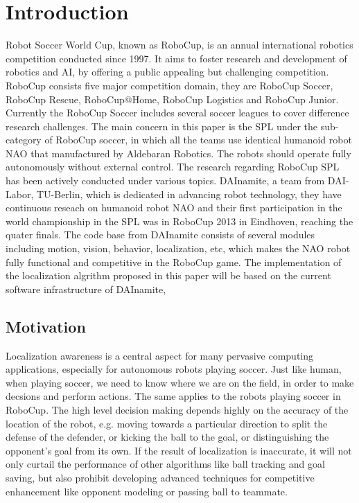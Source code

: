 \chapter{Introduction\label{cha:chapter1}}

Robot Soccer World Cup, known as RoboCup, is an annual international robotics competition conducted since 1997. It aims to foster research and development of robotics and \gls{AI}, by offering a public appealing but challenging competition. RoboCup consists five major competition domain, they are RoboCup Soccer, RoboCup Rescue, RoboCup@Home, RoboCup Logistics and RoboCup Junior. Currently the RoboCup Soccer includes several soccer leagues to cover difference research challenges. The main concern in this paper is the \gls{SPL} under the sub-category of RoboCup soccer, in which all the teams use identical humanoid robot NAO that manufactured by Aldebaran Robotics{\textregistered}. The robots should operate fully autonomously without external control. 
The research regarding RoboCup \gls{SPL} has been actively conducted under various topics. DAInamite, a team from DAI-Labor, TU-Berlin, which is dedicated in advancing robot technology, they have continuous reseach on humanoid robot NAO and their first participation in the world championship in the SPL was in RoboCup 2013 in Eindhoven, reaching the quater finals. The code base from DAInamite consists of several modules including motion, vision, behavior, localization, etc, which makes the NAO robot fully functional and competitive in the RoboCup game.
The implementation of the localization algrithm proposed in this paper will be based on the current software infrastructure of DAInamite,  

\section{Motivation\label{sec:moti}}
Localization awareness is a central aspect for many pervasive computing applications, especially for autonomous robots playing soccer. Just like human,  when playing soccer, we need to know where we are on the field, in order to make decsions and perform actions. The same applies to the robots playing soccer in RoboCup. The high level decision making depends highly on the accuracy of the location of the robot, e.g. moving towards a particular direction to split the defense of the defender, or kicking the ball to the goal, or distinguishing the opponent's goal from its own. If the result of localization is inaccurate, it will not only curtail the performance of other algorithms like ball tracking and goal saving, but also prohibit developing advanced techniques for competitive enhancement like opponent modeling or passing ball to teammate. 

